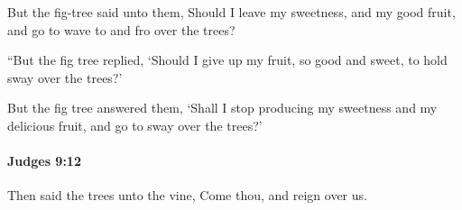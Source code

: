 			\begin{versebox}
					\item[BHS] 
					\item[ASV] But the fig-tree said unto them, Should I leave my sweetness, and my good fruit, and go to wave to and fro over the trees?
					\item[NIV] “But the fig tree replied, ‘Should I give up my fruit, so good and sweet, to hold sway over the trees?’
					\item[NRSV] But the fig tree answered them, ‘Shall I stop producing my sweetness and my delicious fruit, and go to sway over the trees?’
			\end{versebox}

		\paragraph{Judges 9:12} %
			\label{JUDGES-9-12}

			Then said the trees unto the vine, Come thou, and reign over us.

